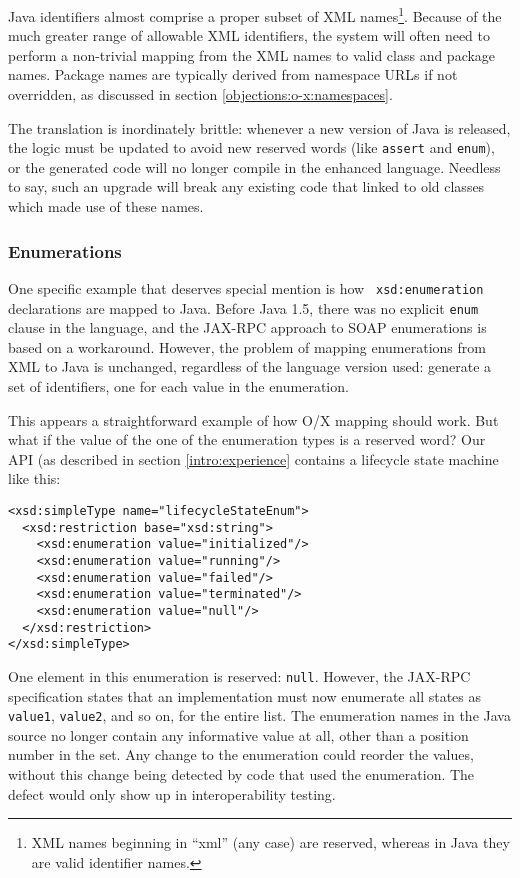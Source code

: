 Java identifiers almost comprise a proper subset of XML
names\footnote{XML names beginning in ``xml'' (any case) are reserved, whereas in
Java they are valid identifier names.}.
Because of the much greater range of allowable XML identifiers, the
system will often need to perform a non-trivial mapping from the XML
names to valid class and package names. Package names are typically
derived from namespace URLs if not overridden, as discussed in section
\ref{objections:o-x:namespaces}.

The translation is inordinately brittle: whenever a new
version of Java is released, the logic must be updated to avoid new
reserved words (like {\tt assert} and {\tt enum}), or the generated
code will no longer compile in the enhanced language. Needless to say,
such an upgrade will break any existing code that linked to old
classes which made use of these names.

\subsubsection{Enumerations}
\label{objections:o-x:enum}

One specific example that deserves special mention is how {\tt
xsd:enumeration} declarations are mapped to Java. Before Java 1.5,
there was no explicit {\tt enum} clause in the language, and the
JAX-RPC approach to SOAP enumerations is based on a
workaround. However, the problem of mapping enumerations from XML to
Java is unchanged, regardless of the language version used: generate a
set of identifiers, one for each value in the enumeration.

This appears a straightforward example of how O/X mapping should
work. But what if the value of the one of the enumeration types is a
reserved word?  Our API (as described in section
\ref{intro:experience} contains a lifecycle state machine like this:

\begin{verbatim}
<xsd:simpleType name="lifecycleStateEnum">
  <xsd:restriction base="xsd:string"> 
    <xsd:enumeration value="initialized"/> 
    <xsd:enumeration value="running"/> 
    <xsd:enumeration value="failed"/> 
    <xsd:enumeration value="terminated"/> 
    <xsd:enumeration value="null"/> 
  </xsd:restriction>
</xsd:simpleType>
\end{verbatim}

One element in this enumeration is reserved: {\tt null}. However, the
JAX-RPC specification states that an implementation must now enumerate
all states as {\tt value1}, {\tt value2}, and so on, for the entire
list.  The enumeration names in the Java source no longer contain any
informative value at all, other than a position number in the set. Any
change to the enumeration could reorder the values, without this
change being detected by code that used the enumeration. The defect
would only show up in interoperability testing.

